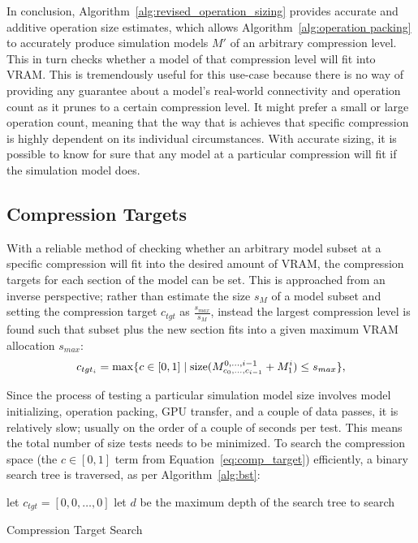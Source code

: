 In conclusion, Algorithm~\ref{alg:revised_operation_sizing} provides accurate and additive operation size estimates,
which allows Algorithm~\ref{alg:operation packing} to accurately produce simulation models $M'$ of an arbitrary compression
level. This in turn checks whether a model of that compression level will fit into VRAM.
This is tremendously useful for this use-case because there is no way of providing any guarantee about a model's
real-world connectivity and operation count as it prunes to a certain compression level. It might prefer a small or large
operation count, meaning that the way that is achieves that specific compression is highly dependent on its individual
circumstances. With accurate sizing, it is possible to know for sure that any model at a particular compression will fit if the
simulation model does.

\subsection{Compression Targets}
With a reliable method of checking whether an arbitrary model subset at a specific compression
will fit into the desired amount of VRAM, the compression targets for each section of the model can be set. This is
approached from an inverse perspective; rather than estimate the size $s_M$ of a model subset
and setting the compression target $c_{tgt}$ as $\frac{s_{max}}{s_M}$, instead the largest compression level is found such that
subset plus the new section fits into a given maximum VRAM allocation $s_{max}$:
\begin{align}
c_{tgt_i} = \max \{ c \in [0, 1] \; | \; \text{size}(M^{0,\dots,i-1}_{c_0, \dots, c_{i-1}} + M^i_1) \le s_{max} \}, \label{eq:comp_target}
\end{align}

Since the process of testing a particular simulation model size involves model initializing, operation packing,
GPU transfer, and a couple of data passes, it is relatively slow; usually on the order of a couple of seconds per test.
This means the total number of size tests needs to be minimized. To search the compression space (the $c \in [0, 1]$ term
from Equation~\ref{eq:comp_target}) efficiently, a binary search tree is traversed, as per Algorithm~\ref{alg:bst}:

\begin{algorithm}
	\SetAlgoLined
	let $c_{tgt}=[0, 0, \dots, 0]$\;
	let $d$ be the maximum depth of the search tree to search
	\caption{Compression Target Search}
	\label{alg:bst}
\end{algorithm}

